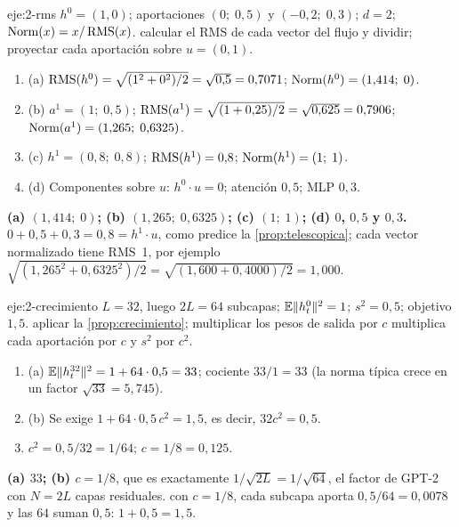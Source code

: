 \begin{solucion}{eje:2-rms}
\datos $h^{0}=(1,0)$; aportaciones $(0;\;0{,}5)$ y $(-0{,}2;\;0{,}3)$; $d=2$; $\operatorname{Norm}(x)=x/\operatorname{RMS}(x)$.
\planteamiento calcular el RMS de cada vector del flujo y dividir; proyectar cada aportación sobre $u=(0,1)$.
\pasos
\begin{enumerate}[label=\arabic*.]
  \item (a) $\operatorname{RMS}(h^{0})=\sqrt{(1^{2}+0^{2})/2}=\sqrt{0{,}5}=0{,}7071$; $\operatorname{Norm}(h^{0})=(1{,}414;\;0)$.
  \item (b) $a^{1}=(1;\;0{,}5)$; $\operatorname{RMS}(a^{1})=\sqrt{(1+0{,}25)/2}=\sqrt{0{,}625}=0{,}7906$; $\operatorname{Norm}(a^{1})=(1{,}265;\;0{,}6325)$.
  \item (c) $h^{1}=(0{,}8;\;0{,}8)$; $\operatorname{RMS}(h^{1})=0{,}8$; $\operatorname{Norm}(h^{1})=(1;\;1)$.
  \item (d) Componentes sobre $u$: $h^{0}\cdot u=0$; atención $0{,}5$; MLP $0{,}3$.
\end{enumerate}
\resultado \textbf{(a) $(1{,}414;\;0)$; (b) $(1{,}265;\;0{,}6325)$; (c) $(1;\;1)$; (d) $0$, $0{,}5$ y $0{,}3$.}
\comprobacion $0+0{,}5+0{,}3=0{,}8=h^{1}\cdot u$, como predice la \cref{prop:telescopica}; cada vector normalizado tiene RMS~1, por ejemplo $\sqrt{(1{,}265^{2}+0{,}6325^{2})/2}=\sqrt{(1{,}600+0{,}4000)/2}=1{,}000$.
\end{solucion}

\begin{solucion}{eje:2-crecimiento}
\datos $L=32$, luego $2L=64$ subcapas; $\mathbb{E}\lVert h^{0}_t\rVert^{2}=1$; $s^{2}=0{,}5$; objetivo $1{,}5$.
\planteamiento aplicar la \cref{prop:crecimiento}; multiplicar los pesos de salida por $c$ multiplica cada aportación por $c$ y $s^{2}$ por $c^{2}$.
\pasos
\begin{enumerate}[label=\arabic*.]
  \item (a) $\mathbb{E}\lVert h^{32}_t\rVert^{2}=1+64\cdot 0{,}5=33$; cociente $33/1=33$ (la norma típica crece en un factor $\sqrt{33}=5{,}745$).
  \item (b) Se exige $1+64\cdot 0{,}5\,c^{2}=1{,}5$, es decir, $32c^{2}=0{,}5$.
  \item $c^{2}=0{,}5/32=1/64$; $c=1/8=0{,}125$.
\end{enumerate}
\resultado \textbf{(a) $33$; (b) $c=1/8$}, que es exactamente $1/\sqrt{2L}=1/\sqrt{64}$, el factor de GPT-2 con $N=2L$ capas residuales.
\comprobacion con $c=1/8$, cada subcapa aporta $0{,}5/64=0{,}0078$ y las $64$ suman $0{,}5$: $1+0{,}5=1{,}5$.
\end{solucion}

